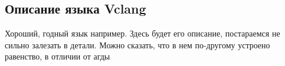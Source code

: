 \subsection{Описание языка Vclang}

Хороший, годный язык например. Здесь будет его описание, постараемся не сильно залезать в детали. Можно сказать, что в нем по-другому устроено равенство, в отличии от агды
